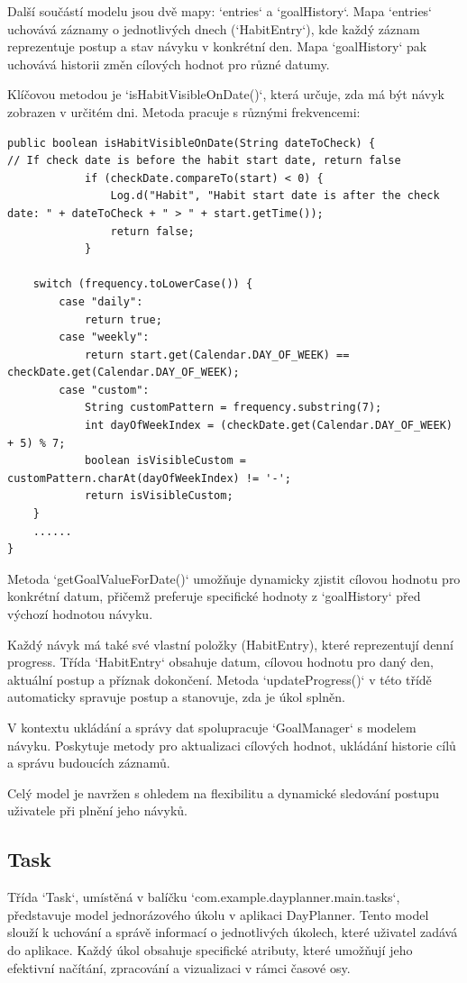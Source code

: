 Další součástí modelu jsou dvě mapy: `entries` a `goalHistory`. Mapa `entries` uchovává záznamy o jednotlivých dnech (`HabitEntry`), kde každý záznam reprezentuje postup a stav návyku v konkrétní den. Mapa `goalHistory` pak uchovává historii změn cílových hodnot pro různé datumy.

Klíčovou metodou je `isHabitVisibleOnDate()`, která určuje, zda má být návyk zobrazen v určitém dni. Metoda pracuje s různými frekvencemi:

\newpage
\begin{lstlisting}[style=javastyle,caption = {isHabitVisibleOnDate},label = {lst:isHabitVisibleOnDate}]
public boolean isHabitVisibleOnDate(String dateToCheck) {
// If check date is before the habit start date, return false
            if (checkDate.compareTo(start) < 0) {
                Log.d("Habit", "Habit start date is after the check date: " + dateToCheck + " > " + start.getTime());
                return false;
            }

    switch (frequency.toLowerCase()) {
        case "daily":
            return true; 
        case "weekly":
            return start.get(Calendar.DAY_OF_WEEK) == checkDate.get(Calendar.DAY_OF_WEEK);
        case "custom":
            String customPattern = frequency.substring(7);
            int dayOfWeekIndex = (checkDate.get(Calendar.DAY_OF_WEEK) + 5) % 7;
            boolean isVisibleCustom = customPattern.charAt(dayOfWeekIndex) != '-';
            return isVisibleCustom;
    }
    ......
}
\end{lstlisting}

Metoda `getGoalValueForDate()` umožňuje dynamicky zjistit cílovou hodnotu pro konkrétní datum, přičemž preferuje specifické hodnoty z `goalHistory` před výchozí hodnotou návyku.

Každý návyk má také své vlastní položky (HabitEntry), které reprezentují denní progress. Třída `HabitEntry` obsahuje datum, cílovou hodnotu pro daný den, aktuální postup a příznak dokončení. Metoda `updateProgress()` v této třídě automaticky spravuje postup a stanovuje, zda je úkol splněn.

V kontextu ukládání a správy dat spolupracuje `GoalManager` s modelem návyku. Poskytuje metody pro aktualizaci cílových hodnot, ukládání historie cílů a správu budoucích záznamů.

Celý model je navržen s ohledem na flexibilitu a dynamické sledování postupu uživatele při plnění jeho návyků.


\subsection{Task}
\hspace{14pt} Třída `Task`, umístěná v balíčku `com.example.dayplanner.main.tasks`, představuje model jednorázového úkolu v aplikaci DayPlanner. Tento model slouží k uchování a správě informací o jednotlivých úkolech, které uživatel zadává do aplikace. Každý úkol obsahuje specifické atributy, které umožňují jeho efektivní načítání, zpracování a vizualizaci v rámci časové osy.  

